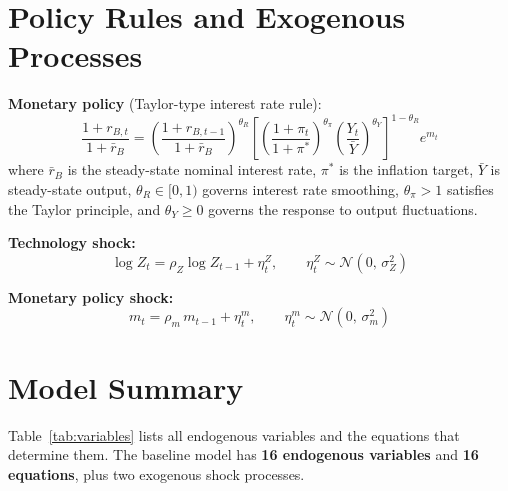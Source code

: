 \documentclass[11pt, a4paper]{article}
\begin{document}
\section{Policy Rules and Exogenous Processes}

\textbf{Monetary policy} (Taylor-type interest rate rule):
\begin{equation}
    \frac{1+r_{B,t}}{1+\bar{r}_B}
    =
    \left(\frac{1+r_{B,t-1}}{1+\bar{r}_B}\right)^{\!\theta_R}
    \!\left[
        \left(\frac{1+\pi_t}{1+\pi^*}\right)^{\!\theta_\pi}
        \left(\frac{Y_t}{\bar{Y}}\right)^{\!\theta_Y}
    \right]^{1-\theta_R}
    e^{m_t}
    \label{eq:taylor}
\end{equation}
%
where $\bar{r}_B$ is the steady-state nominal interest rate, $\pi^*$ is the
inflation target, $\bar{Y}$ is steady-state output, $\theta_R \in [0,1)$
governs interest rate smoothing, $\theta_\pi > 1$ satisfies the Taylor
principle, and $\theta_Y \geq 0$ governs the response to output fluctuations.

\textbf{Technology shock:}
\begin{equation}
    \log Z_t = \rho_Z \log Z_{t-1} + \eta_t^Z,
    \qquad \eta_t^Z \sim \mathcal{N}(0,\,\sigma_Z^2)
    \label{eq:tfp}
\end{equation}

\textbf{Monetary policy shock:}
\begin{equation}
    m_t = \rho_m\,m_{t-1} + \eta_t^m,
    \qquad \eta_t^m \sim \mathcal{N}(0,\,\sigma_m^2)
    \label{eq:mp_shock}
\end{equation}

\section{Model Summary}

Table~\ref{tab:variables} lists all endogenous variables and the equations that
determine them. The baseline model has \textbf{16 endogenous variables} and
\textbf{16 equations}, plus two exogenous shock processes.
\end{document}
